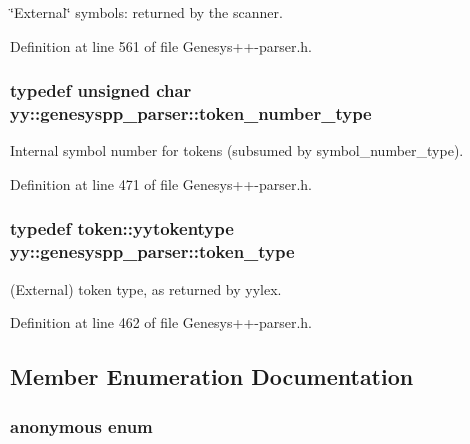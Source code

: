 \char`\"{}\-External\char`\"{} symbols\-: returned by the scanner. 



Definition at line 561 of file Genesys++-\/parser.\-h.

\hypertarget{classyy_1_1genesyspp__parser_aa489989bd38c35b366db6b5be5083bcf}{
\subsubsection[{token\-\_\-number\-\_\-type}]{\setlength{\rightskip}{0pt plus 5cm}typedef unsigned char {\bf yy\-::genesyspp\-\_\-parser\-::token\-\_\-number\-\_\-type}}}\label{classyy_1_1genesyspp__parser_aa489989bd38c35b366db6b5be5083bcf}


Internal symbol number for tokens (subsumed by symbol\-\_\-number\-\_\-type). 



Definition at line 471 of file Genesys++-\/parser.\-h.

\hypertarget{classyy_1_1genesyspp__parser_a12db38f833589f8357b8443818db9514}{
\subsubsection[{token\-\_\-type}]{\setlength{\rightskip}{0pt plus 5cm}typedef {\bf token\-::yytokentype} {\bf yy\-::genesyspp\-\_\-parser\-::token\-\_\-type}}}\label{classyy_1_1genesyspp__parser_a12db38f833589f8357b8443818db9514}


(External) token type, as returned by yylex. 



Definition at line 462 of file Genesys++-\/parser.\-h.



\subsection{Member Enumeration Documentation}
\hypertarget{classyy_1_1genesyspp__parser_a5bdf576f03edcaee4e81f263b3ea1f18}{\subsubsection[{anonymous enum}]{\setlength{\rightskip}{0pt plus 5cm}anonymous enum}}\label{classyy_1_1genesyspp__parser_a5bdf576f03edcaee4e81f263b3ea1f18}


